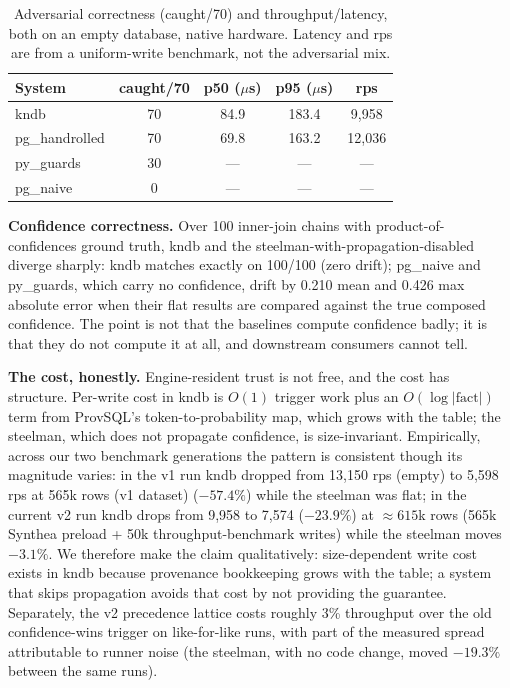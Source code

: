 \documentclass[sigconf,nonacm]{acmart}
\begin{document}
\begin{table}[h]
\centering\small
\begin{tabular}{lcccc}
\toprule
System & caught/70 & p50 ($\mu$s) & p95 ($\mu$s) & rps \\
\midrule
kndb & 70 & 84.9 & 183.4 & 9,958 \\
pg\_handrolled & 70 & 69.8 & 163.2 & 12,036 \\
py\_guards & 30 & --- & --- & --- \\
pg\_naive & 0 & --- & --- & --- \\
\bottomrule
\end{tabular}
\caption{Adversarial correctness (caught/70) and throughput/latency, both on an empty database, native hardware. Latency and rps are from a uniform-write benchmark, not the adversarial mix.}
\label{tab:adv}
\end{table}

\noindent\textbf{Confidence correctness.} Over 100 inner-join chains with product-of-confidences ground truth, kndb and the steelman-with-propagation-disabled diverge sharply: kndb matches exactly on 100/100 (zero drift); pg\_naive and py\_guards, which carry no confidence, drift by 0.210 mean and 0.426 max absolute error when their flat results are compared against the true composed confidence. The point is not that the baselines compute confidence badly; it is that they do not compute it at all, and downstream consumers cannot tell.

\noindent\textbf{The cost, honestly.} Engine-resident trust is not free, and the cost has structure. Per-write cost in kndb is $O(1)$ trigger work plus an $O(\log |\mathrm{fact}|)$ term from ProvSQL's token-to-probability map, which grows with the table; the steelman, which does not propagate confidence, is size-invariant. Empirically, across our two benchmark generations the pattern is consistent though its magnitude varies: in the v1 run kndb dropped from 13,150 rps (empty) to 5,598 rps at 565k rows (v1 dataset) ($-57.4\%$) while the steelman was flat; in the current v2 run kndb drops from 9,958 to 7,574 ($-23.9\%$) at ${\approx}615$k rows (565k Synthea preload + 50k throughput-benchmark writes) while the steelman moves $-3.1\%$. We therefore make the claim qualitatively: size-dependent write cost exists in kndb because provenance bookkeeping grows with the table; a system that skips propagation avoids that cost by not providing the guarantee. Separately, the v2 precedence lattice costs roughly 3\% throughput over the old confidence-wins trigger on like-for-like runs, with part of the measured spread attributable to runner noise (the steelman, with no code change, moved $-19.3\%$ between the same runs).
\end{document}
